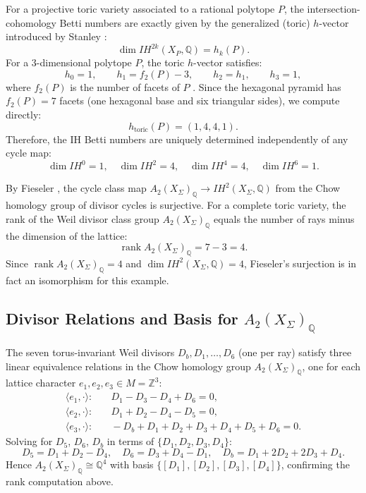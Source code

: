 \documentclass[12pt,reqno]{amsart}
\theoremstyle{plain}
\theoremstyle{definition}
\newcommand{\IQ}{\mathbb{Q}}
\newcommand{\IZ}{\mathbb{Z}}
\newcommand{\Chowh}[1]{A_{#1}}
\begin{document}
	For a projective toric variety associated to a rational polytope $P$, the intersection-cohomology Betti numbers are exactly given by the generalized (toric) $h$-vector introduced by Stanley \cite{Stanley87}:
	\[
	\dim IH^{2k}(X_P, \IQ) = h_k(P).
	\]
	For a $3$-dimensional polytope $P$, the toric $h$-vector satisfies:
	\[
	h_0 = 1,\qquad h_1 = f_2(P) - 3,\qquad h_2 = h_1,\qquad h_3 = 1,
	\]
	where $f_2(P)$ is the number of facets of $P$ \cite[Theorem 2.3]{Stanley87}. Since the hexagonal pyramid has $f_2(P) = 7$ facets (one hexagonal base and six triangular sides), we compute directly:
	\[
	h_{\mathrm{toric}}(P) = (1, 4, 4, 1).
	\]
	Therefore, the IH Betti numbers are uniquely determined independently of any cycle map:
	\[
	\dim IH^0 = 1,\quad \dim IH^2 = 4,\quad \dim IH^4 = 4,\quad \dim IH^6 = 1.
	\]
	
	By Fieseler \cite[Theorem 1.1]{Fieseler91}, the cycle class map $\Chowh{2}(X_\Sigma)_\IQ \to IH^2(X_\Sigma, \IQ)$ from the Chow homology group of divisor cycles is surjective. For a complete toric variety, the rank of the Weil divisor class group $\Chowh{2}(X_\Sigma)_\IQ$ equals the number of rays minus the dimension of the lattice:
	\[
	\operatorname{rank} \Chowh{2}(X_\Sigma)_\IQ = 7 - 3 = 4.
	\]
	Since $\operatorname{rank} \Chowh{2}(X_\Sigma)_\IQ = 4$ and $\dim IH^2(X_\Sigma, \IQ) = 4$, Fieseler's surjection is in fact an isomorphism for this example.
	
	\subsection{Divisor Relations and Basis for $\Chowh{2}(X_\Sigma)_\IQ$}
	
	The seven torus-invariant Weil divisors $D_b, D_1, \dots, D_6$ (one per ray) satisfy three linear equivalence relations in the Chow homology group $\Chowh{2}(X_\Sigma)_\IQ$, one for each lattice character $e_1, e_2, e_3 \in M = \IZ^3$:
	\begin{align*}
		\langle e_1, \cdot \rangle: &\quad D_1 - D_3 - D_4 + D_6 = 0, \\
		\langle e_2, \cdot \rangle: &\quad D_1 + D_2 - D_4 - D_5 = 0, \\
		\langle e_3, \cdot \rangle: &\quad -D_b + D_1 + D_2 + D_3 + D_4 + D_5 + D_6 = 0.
	\end{align*}
	Solving for $D_5$, $D_6$, $D_b$ in terms of $\{D_1, D_2, D_3, D_4\}$:
	\[
	D_5 = D_1 + D_2 - D_4, \quad D_6 = D_3 + D_4 - D_1, \quad D_b = D_1 + 2D_2 + 2D_3 + D_4.
	\]
	Hence $\Chowh{2}(X_\Sigma)_\IQ \cong \IQ^4$ with basis $\{[D_1],[D_2],[D_3],[D_4]\}$, confirming the rank computation above.
	
\end{document}
